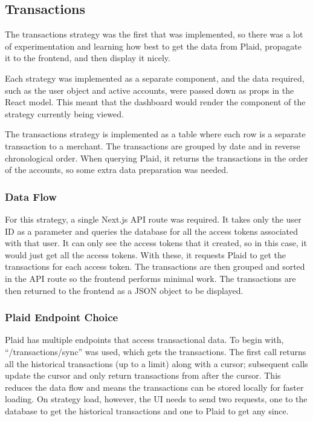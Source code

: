 \subsection{Transactions}
The transactions strategy was the first that was implemented, so there was a lot of experimentation and learning how best to get the data from Plaid, propagate it to the frontend, and then display it nicely.

Each strategy was implemented as a separate component, and the data required, such as the user object and active accounts, were passed down as props in the React model. This meant that the dashboard would render the component of the strategy currently being viewed.

The transactions strategy is implemented as a table where each row is a separate transaction to a merchant. The transactions are grouped by date and in reverse chronological order. When querying Plaid, it returns the transactions in the order of the accounts, so some extra data preparation was needed.

\subsubsection{Data Flow}
For this strategy, a single Next.js API route was required. It takes only the user ID as a parameter and queries the database for all the access tokens associated with that user. It can only see the access tokens that it created, so in this case, it would just get all the access tokens. With these, it requests Plaid to get the transactions for each access token. The transactions are then grouped and sorted in the API route so the frontend performs minimal work. The transactions are then returned to the frontend as a JSON object to be displayed.

\subsubsection{Plaid Endpoint Choice}
Plaid has multiple endpoints that access transactional data. To begin with, ``/transactions/sync'' was used, which gets the transactions. The first call returns all the historical transactions (up to a limit) along with a cursor; subsequent calls update the cursor and only return transactions from after the cursor. This reduces the data flow and means the transactions can be stored locally for faster loading. On strategy load, however, the UI needs to send two requests, one to the database to get the historical transactions and one to Plaid to get any since.

